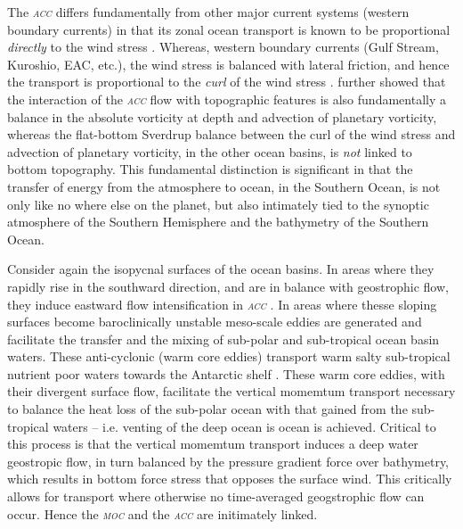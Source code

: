 \documentclass[11pt,a4paper]{article}
\newcommand{\moc}{\textit{\textsc{moc }}} %
\newcommand{\acc}{\textit{\textsc{{acc }}}} %
\begin{document}
The \acc differs fundamentally from other major current
systems (western boundary currents) in that its zonal ocean transport
is known to be proportional \textit{directly} to the wind stress
\citep{munkNoteDynamicsAntarctic1951}. Whereas, western boundary
currents (Gulf Stream, Kuroshio, EAC, etc.), the wind stress is
balanced with lateral friction, and hence the transport is proportional to the
\textit{curl} of the wind stress
\citep{munkNoteDynamicsAntarctic1951}. \cite{hughesWhyWesternBoundary2001}
further showed that the interaction of the \acc flow with topographic features is also
fundamentally a balance in the absolute vorticity at depth and
advection of planetary vorticity, whereas the flat-bottom Sverdrup
balance between the curl of the wind stress and advection of planetary
vorticity, in the other ocean basins, is \textit{not} linked to bottom
topography. This fundamental distinction is
significant in that the transfer of energy from the atmosphere to
ocean, in the Southern Ocean, is not only like no where else on the
planet, but also intimately tied to the synoptic atmosphere of the
Southern Hemisphere and the bathymetry of the Southern Ocean.

Consider again the isopycnal surfaces of the ocean basins. In areas
where they rapidly rise in the southward direction, and are in balance
with geostrophic flow, they induce eastward flow intensification in
\acc. In areas where thesse sloping surfaces become baroclinically unstable meso-scale eddies are generated and facilitate
the transfer and the mixing of sub-polar and sub-tropical ocean basin waters. These
anti-cyclonic (warm core eddies) transport warm salty sub-tropical
nutrient poor waters towards the Antarctic shelf
\citep{rintoulGlobalInfluenceLocalized2018}. These warm core eddies,
with their divergent surface flow, facilitate the vertical momemtum
transport necessary to balance the heat loss of the sub-polar ocean
with that gained from the sub-tropical waters -- i.e. venting of the
deep ocean is ocean is achieved. Critical to this process is that the
vertical momemtum transport induces a deep water geostropic flow, in
turn balanced by the pressure gradient force over bathymetry, which
results in bottom force stress that opposes the surface wind. This
critically allows for transport where otherwise no time-averaged
geogstrophic flow can occur. Hence the \moc and the \acc are
initimately linked.
\end{document}

